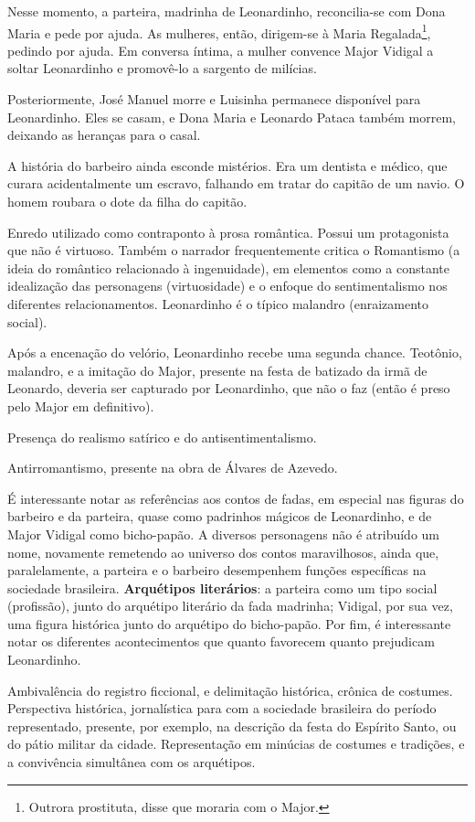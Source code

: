 Nesse momento, a parteira, madrinha de Leonardinho, reconcilia-se com Dona Maria e pede por ajuda. As mulheres, então, dirigem-se à Maria Regalada\footnote{Outrora prostituta, disse que moraria com o Major.}, pedindo por ajuda. Em conversa íntima, a mulher convence Major Vidigal a soltar Leonardinho e promovê-lo a sargento de milícias.

Posteriormente, José Manuel morre e Luisinha permanece disponível para Leonardinho. Eles se casam, e Dona Maria e Leonardo Pataca também morrem, deixando as heranças para o casal.

A história do barbeiro ainda esconde mistérios. Era um dentista e médico, que curara acidentalmente um escravo, falhando em tratar do capitão de um navio. O homem roubara o dote da filha do capitão.

Enredo utilizado como contraponto à prosa romântica. Possui um protagonista que não é virtuoso. Também o narrador frequentemente critica o Romantismo (a ideia do romântico relacionado à ingenuidade), em elementos como a constante idealização das personagens (virtuosidade) e o enfoque do sentimentalismo nos diferentes relacionamentos. Leonardinho é o típico malandro (enraizamento social).

Após a encenação do velório, Leonardinho recebe uma segunda chance. Teotônio, malandro, e a imitação do Major, presente na festa de batizado da irmã de Leonardo, deveria ser capturado por Leonardinho, que não o faz (então é preso pelo Major em definitivo).

Presença do realismo satírico e do antisentimentalismo.

Antirromantismo, presente na obra de Álvares de Azevedo.

É interessante notar as referências aos contos de fadas, em especial nas figuras do barbeiro e da parteira, quase como padrinhos mágicos de Leonardinho, e de Major Vidigal como bicho-papão. A diversos personagens não é atribuído um nome, novamente remetendo ao universo dos contos maravilhosos, ainda que, paralelamente, a parteira e o barbeiro desempenhem funções específicas na sociedade brasileira. \textbf{Arquétipos literários}: a parteira como um tipo social (profissão), junto do arquétipo literário da fada madrinha; Vidigal, por sua vez, uma figura histórica junto do arquétipo do bicho-papão. Por fim, é interessante notar os diferentes acontecimentos que quanto favorecem quanto prejudicam Leonardinho.

Ambivalência do registro ficcional, e delimitação histórica, crônica de costumes. Perspectiva histórica, jornalística para com a sociedade brasileira do período representado, presente, por exemplo, na descrição da festa do Espírito Santo, ou do pátio militar da cidade. Representação em minúcias de costumes e tradições, e a convivência simultânea com os arquétipos.

